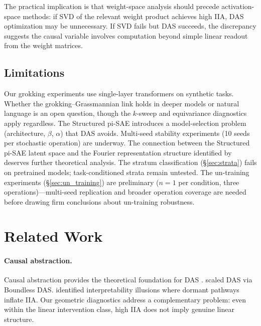 \documentclass{article}
\begin{document}
The practical implication is that weight-space analysis should precede
activation-space methods: if SVD of the relevant weight product achieves
high IIA, DAS optimization may be unnecessary. If SVD fails but DAS
succeeds, the discrepancy suggests the causal variable involves
computation beyond simple linear readout from the weight matrices.

\subsection{Limitations}

Our grokking experiments use single-layer transformers on synthetic tasks.
Whether the grokking--Grassmannian link holds in deeper models or natural
language is an open question, though the $k$-sweep and equivariance
diagnostics apply regardless. The Structured pi-SAE introduces a model-selection
problem (architecture, $\beta$, $\alpha$) that DAS avoids. Multi-seed
stability experiments (10 seeds per stochastic operation) are underway. The
connection between the Structured pi-SAE latent space and the Fourier
representation structure identified by \citet{nanda2023progress} deserves
further theoretical analysis. The stratum classification
(\S\ref{sec:strata}) fails on pretrained models; task-conditioned strata
remain untested. The un-training experiments (\S\ref{sec:un_training}) are
preliminary ($n{=}1$ per condition, three operations)---multi-seed
replication and broader operation coverage are needed before drawing firm
conclusions about un-training robustness.


\section{Related Work}
\label{sec:related}

\paragraph{Causal abstraction.}
Causal abstraction provides the theoretical foundation for DAS
\citep{geiger2021causal, geiger2023finding}. \citet{wu2024interpretability}
scaled DAS via Boundless DAS. \citet{makelov2024illusion} identified
interpretability illusions where dormant pathways inflate IIA. Our geometric
diagnostics address a complementary problem: even within the linear intervention
class, high IIA does not imply genuine linear structure.
\end{document}
